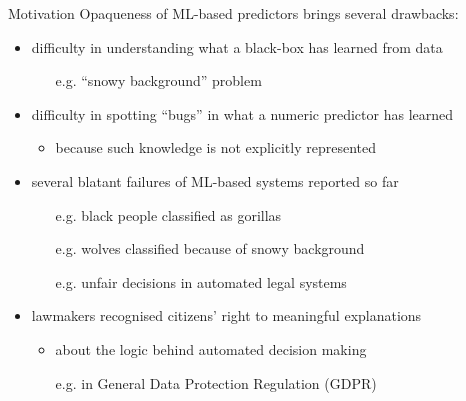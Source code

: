 \documentclass[presentation]{beamer}\mode<presentation>{\usetheme{AMSBolognaFC}}
\begin{document}
\begin{frame}[c]{Motivation}
    \alert{Opaqueness} of ML-based predictors brings several \alert{drawbacks}:
    \vfill
    \begin{itemize}
        \item difficulty in \alert{understanding} what a black-box has learned from data
        \begin{itemize}
            \item[e.g.] ``snowy background'' problem
        \end{itemize}
        
        \vfill
        
        \item difficulty in spotting ``\alert{bugs}'' in what a numeric predictor has learned
        \begin{itemize}
            \item because such knowledge is not explicitly represented
        \end{itemize}
        
        \vfill
        
        \item several blatant \alert{failures} of ML-based systems reported so far
        \begin{itemize}
            \item[e.g.] black people classified as gorillas 
            \item[e.g.] wolves classified because of snowy background 
            \item[e.g.] unfair decisions in automated legal systems 
        \end{itemize}
        
        \vfill
        
        \item lawmakers recognised citizens' \alert{right} to meaningful \alert{explanations} 
        \begin{itemize}
            \item about the \alert{logic} behind automated decision making
            \item[e.g.] in General Data Protection Regulation (\alert{GDPR}) 
        \end{itemize}
    \end{itemize}
\end{frame}
\end{document}
